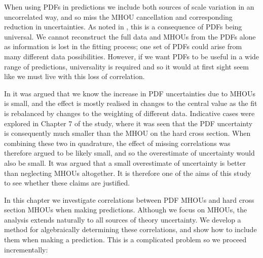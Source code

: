 When using PDFs in predictions we include both sources of scale variation in an uncorrelated way, and so miss the MHOU cancellation and corresponding reduction in uncertainties. As noted in \cite{AbdulKhalek:2019ihb}, this is a consequence of PDFs being universal. We cannot reconstruct the full data and MHOUs from the PDFs alone as information is lost in the fitting process; one set of PDFs could arise from many different data possibilities. However, if we want PDFs to be useful in a wide range of predictions, universality is required and so it would at first sight seem like we must live with this loss of correlation.

In \cite{AbdulKhalek:2019ihb} it was argued that we know the increase in PDF uncertainties due to MHOUs is small, and the effect is mostly realised in changes to the central value as the fit is rebalanced by changes to the weighting of different data. Indicative cases were explored in Chapter 7 of the study, where it was seen that the PDF uncertainty is consequently much smaller than the MHOU on the hard cross section. When combining these two in quadrature, the effect of missing correlations was therefore argued to be likely small, and so the overestimate of uncertainty would also be small. It was argued that a small overestimate of uncertainty is better than neglecting MHOUs altogether. It is therefore one of the aims of this study to see whether these claims are justified.

In this chapter we investigate correlations between PDF MHOUs and hard cross section MHOUs when making predictions. Although we focus on MHOUs, the analysis extends naturally to all sources of theory uncertainty. We develop a method for algebraically determining these correlations, and show how to include them when making a prediction. This is a complicated problem so we proceed incrementally:

